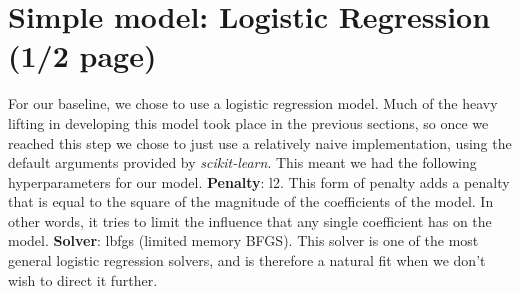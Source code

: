 \section{Simple model: Logistic Regression (1/2 page)} 
For our baseline, we chose to use a logistic regression model. Much of the heavy lifting in developing this model took place in the previous sections,
so once we reached this step we chose to just use a relatively naive implementation, using the default arguments provided
by \textit{scikit-learn}. This meant we had the following hyperparameters for our model. \textbf{Penalty}: l2. This form of penalty adds a penalty that is equal to the square of the magnitude of the
    coefficients of the model. In other words, it tries to limit the influence that any single coefficient has on the
    model. \textbf{Solver}: lbfgs (limited memory BFGS). This solver is one of the most general logistic regression
    solvers, and is therefore a natural fit when we don't wish to direct it further.

